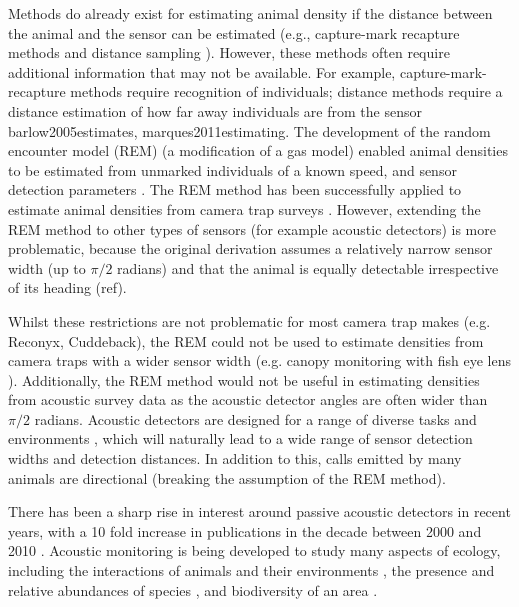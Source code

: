 \documentclass[a4paper,10pt,reqno,oneside]{amsart}
\begin{document}
Methods do already exist for estimating animal density if the distance between the animal and the sensor can be estimated (e.g., capture-mark recapture methods \citep{karanth1995estimating} and distance sampling \citep{harris2013applying}). However, these methods often require additional information that may not be available. For example, capture-mark-recapture methods \citep{karanth1995estimating, trolle2003estimation, soisalo2006estimating, trolle2007camera} require recognition of individuals; distance methods require a distance estimation of how far away individuals are from the sensor {barlow2005estimates, marques2011estimating}. The development of the random encounter model (REM) (a modification of a gas model) enabled animal densities to be estimated from unmarked individuals of a known speed, and sensor detection parameters \citep{rowcliffe2008estimating}. The REM method has been successfully applied to estimate animal densities from camera trap surveys \citep{manzo2012estimation, zero2013monitoring}. However, extending the REM method to other types of sensors (for example acoustic detectors) is more problematic, because the original derivation assumes a relatively narrow sensor width (up to $\pi/2$ radians) and that the animal is equally detectable irrespective of its heading (ref). %

Whilst these restrictions are not problematic for most camera trap makes (e.g. Reconyx, Cuddeback), the REM could not be used to estimate densities from camera traps with a wider sensor width (e.g. canopy monitoring with fish eye lens \citep{brusa2014increasing}). Additionally, the REM method would not be useful in estimating densities from acoustic survey data as the acoustic detector angles are often wider than $\pi/2$ radians.  Acoustic detectors are designed for a range of diverse tasks and environments \citep{kessel2014review}, which will naturally lead to a wide range of sensor detection widths and detection distances. In addition to this, calls emitted by many animals are directional (breaking the assumption of the REM method). 

There has been a sharp rise in interest around passive acoustic detectors in recent years, with a 10 fold increase in publications in the decade between 2000 and 2010 \citep{kessel2014review}. Acoustic monitoring is being developed to study many aspects of ecology, including the interactions of animals and their environments \citep{blumstein2011acoustic, rogers2013density}, the presence and relative abundances of species \citep{marcoux2011local}, and biodiversity of an area \citep{depraetere2012monitoring}. 
\end{document}
